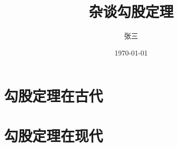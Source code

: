 \documentclass[UTF8]{ctexart}
\title{杂谈勾股定理}
\author{张三}
\date{\today}
\begin{document}
\maketitle
\tableofcontents
\section{勾股定理在古代}
\section{勾股定理在现代}

\end{document}
